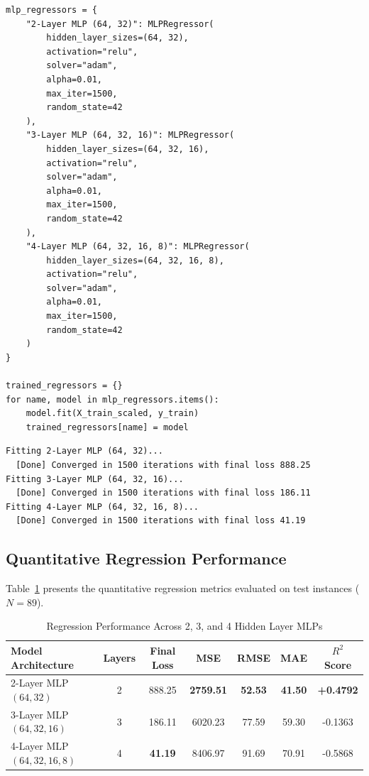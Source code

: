 \documentclass[12pt]{article}
\begin{document}
\begin{lstlisting}[style=code]
mlp_regressors = {
    "2-Layer MLP (64, 32)": MLPRegressor(
        hidden_layer_sizes=(64, 32),
        activation="relu",
        solver="adam",
        alpha=0.01,
        max_iter=1500,
        random_state=42
    ),
    "3-Layer MLP (64, 32, 16)": MLPRegressor(
        hidden_layer_sizes=(64, 32, 16),
        activation="relu",
        solver="adam",
        alpha=0.01,
        max_iter=1500,
        random_state=42
    ),
    "4-Layer MLP (64, 32, 16, 8)": MLPRegressor(
        hidden_layer_sizes=(64, 32, 16, 8),
        activation="relu",
        solver="adam",
        alpha=0.01,
        max_iter=1500,
        random_state=42
    )
}

trained_regressors = {}
for name, model in mlp_regressors.items():
    model.fit(X_train_scaled, y_train)
    trained_regressors[name] = model
\end{lstlisting}

\begin{lstlisting}[style=output]
Fitting 2-Layer MLP (64, 32)...
  [Done] Converged in 1500 iterations with final loss 888.25
Fitting 3-Layer MLP (64, 32, 16)...
  [Done] Converged in 1500 iterations with final loss 186.11
Fitting 4-Layer MLP (64, 32, 16, 8)...
  [Done] Converged in 1500 iterations with final loss 41.19
\end{lstlisting}

\subsection{Quantitative Regression Performance}
Table~\ref{tab:reg_results} presents the quantitative regression metrics evaluated on test instances ($N=89$).

\begin{table}[H]
\centering
\caption{Regression Performance Across 2, 3, and 4 Hidden Layer MLPs}
\label{tab:reg_results}
\vspace{0.2cm}
\begin{tabular}{lcccccc}
\toprule
\textbf{Model Architecture} & \textbf{Layers} & \textbf{Final Loss} & \textbf{MSE} & \textbf{RMSE} & \textbf{MAE} & \textbf{$R^2$ Score} \\
\midrule
2-Layer MLP $(64, 32)$          & 2 & 888.25 & \textbf{2759.51} & \textbf{52.53} & \textbf{41.50} & \textbf{+0.4792} \\
3-Layer MLP $(64, 32, 16)$      & 3 & 186.11 & 6020.23 & 77.59 & 59.30 & -0.1363 \\
4-Layer MLP $(64, 32, 16, 8)$   & 4 & \textbf{41.19}  & 8406.97 & 91.69 & 70.91 & -0.5868 \\
\bottomrule
\end{tabular}
\end{table}
\end{document}

